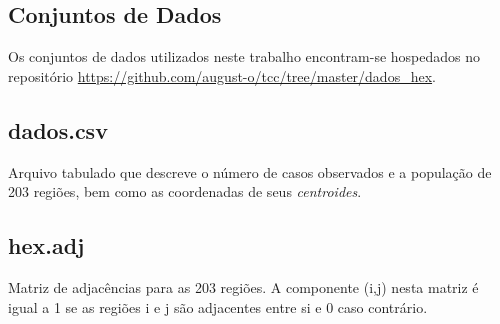 \documentclass[
	12pt,				%
	openright,			%
	twoside,			%
	a4paper,			%
	english,			%
	brazil,				%
	]{abntex2}
\begin{document}
\begin{anexosenv}



\chapter{Conjuntos de Dados}
\label{anex:dados}

Os conjuntos de dados utilizados neste trabalho encontram-se hospedados no repositório \url{https://github.com/august-o/tcc/tree/master/dados_hex}. 

\section{dados.csv}

Arquivo tabulado que descreve o número de casos observados e a população de 203 regiões, bem como as coordenadas de seus \textit{centroides}.

\section{hex.adj}

Matriz de adjacências para as 203 regiões. A componente (i,j) nesta matriz é igual a 1 se as regiões i e j são adjacentes entre si e 0 caso contrário.
\end{anexosenv}


\printindex
\end{document}
